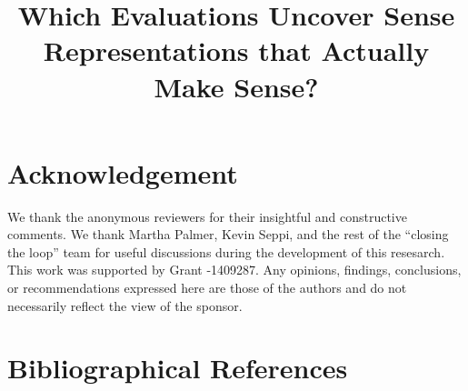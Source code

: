 \documentclass[table, 10pt, a4paper]{article} \usepackage{style/lrec}  \usepackage{tocloft}
\title{Which Evaluations Uncover Sense Representations that Actually Make Sense?}
\renewcommand\thesection{\arabic{section}}
\newcommand{\latexfile}[1]{}
\newcommand{\appendixmention}[1]{}
\begin{document}
\maketitleabstract

	\latexfile{10-introduction}
	\latexfile{20-model}
	\latexfile{training}
	\latexfile{30-interpretability}
	\latexfile{40-eval}        
	\latexfile{50-discussion}
	\latexfile{60-related}
	\latexfile{70-conclusion}


        \section*{Acknowledgement}

        We thank the anonymous reviewers for their insightful and
        constructive comments. We thank Martha Palmer, Kevin Seppi,
        and the rest of the ``closing the loop'' team for useful
        discussions during the development of this resesarch.  This
        work was supported by  Grant -1409287.  Any
        opinions, findings, conclusions, or recommendations expressed
        here are those of the authors and do not necessarily reflect
        the view of the sponsor.


    
\newpage
        
\section{Bibliographical References}\label{reference}




\appendixmention{
\clearpage

\section*{Appendix}

Equation and
figure numbers continue from main submission.

\setcounter{section}{0}
\renewcommand{\thesection}{\Alph{section}} 
\latexfile{appendix}
}
\end{document}
